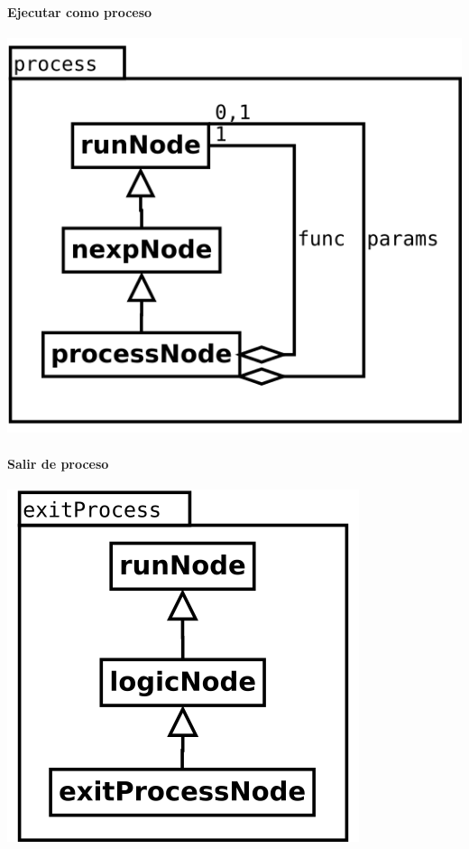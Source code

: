 \begin{multicols}{2}
   \paragraph {Ejecutar como proceso} 
   \begin{center}
   \includegraphics[scale=0.4]{process.png} \\
   \end{center}
\columnbreak
   \paragraph {Salir de proceso} 
   \begin{center}
   \includegraphics[scale=0.4]{exitProcess.png} \\
   \end{center}
\end{multicols}


